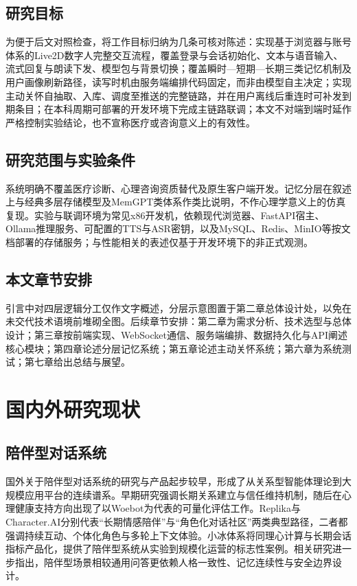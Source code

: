 \documentclass{base}
\begin{document}
\subsection{研究目标}

为便于后文对照检查，将工作目标归纳为几条可核对陈述：实现基于浏览器与账号体系的Live2D数字人完整交互流程，覆盖登录与会话初始化、文本与语音输入、流式回复与朗读下发、模型包与背景切换；覆盖瞬时—短期—长期三类记忆机制及用户画像刷新路径，读写时机由服务端编排代码固定，而非由模型自主决定；实现主动关怀自抽取、入库、调度至推送的完整链路，并在用户离线后重连时可补发到期条目；在本科周期可部署的开发环境下完成主链路联调；本文不对端到端时延作严格控制实验结论，也不宣称医疗或咨询意义上的有效性。

\subsection{研究范围与实验条件}

系统明确不覆盖医疗诊断、心理咨询资质替代及原生客户端开发。记忆分层在叙述上与经典多层存储模型及MemGPT类体系作类比说明\cite{Atkinson1968,MemGPT2023}，不作心理学意义上的仿真复现。实验与联调环境为常见x86开发机，依赖现代浏览器、FastAPI宿主、Ollama推理服务、可配置的TTS与ASR密钥，以及MySQL、Redis、MinIO等按文档部署的存储服务；与性能相关的表述仅基于开发环境下的非正式观测。

\subsection{本文章节安排}

引言中对四层逻辑分工仅作文字概述，分层示意图置于第二章总体设计处，以免在未交代技术语境前堆砌全图。后续章节安排：第二章为需求分析、技术选型与总体设计；第三章按前端实现、WebSocket通信、服务端编排、数据持久化与API阐述核心模块；第四章论述分层记忆系统；第五章论述主动关怀系统；第六章为系统测试；第七章给出总结与展望。

\section{国内外研究现状}

\subsection{陪伴型对话系统}

国外关于陪伴型对话系统的研究与产品起步较早，形成了从关系型智能体理论到大规模应用平台的连续谱系。早期研究强调长期关系建立与信任维持机制\cite{Bickmore2005}，随后在心理健康支持方向出现了以Woebot为代表的可量化评估工作\cite{Fitzpatrick2017}。Replika与Character.AI分别代表``长期情感陪伴''与``角色化对话社区''两类典型路径，二者都强调持续互动、个体化角色与多轮上下文体验\cite{ReplikaOfficial,CharacterAIAbout}。小冰体系将同理心计算与长期会话指标产品化，提供了陪伴型系统从实验到规模化运营的标志性案例\cite{ShumXiaoice2020}。相关研究进一步指出，陪伴型场景相较通用问答更依赖人格一致性、记忆连续性与安全边界设计\cite{Roller2021,Zhao2023Survey}。
\end{document}
